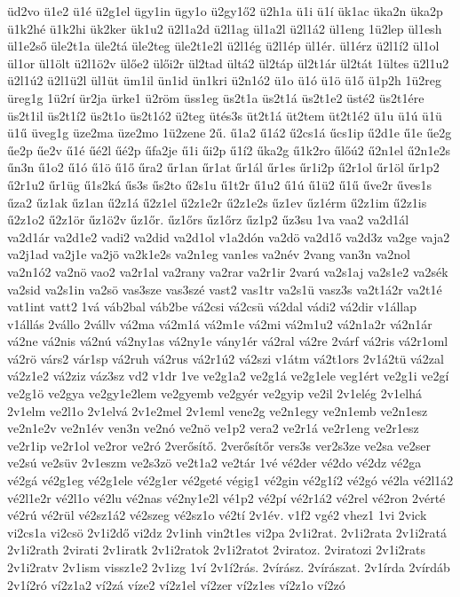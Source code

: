{üd2vo
ü1e2
ü1é
ü2g1el
ügy1in
ügy1o
ü2gy1ő2
ü2h1a
ü1i
ü1í
ük1ac
üka2n
üka2p
ü1k2hé
ü1k2hi
ük2ker
ük1u2
ü2l1a2d
ü2l1ag
ül1a2l
ü2l1á2
ül1eng
1ü2lep
ül1esh
ül1e2ső
üle2t1a
üle2tá
üle2teg
üle2t1e2l
ü2l1ég
ü2l1ép
ül1ér.
ül1érz
ü2l1í2
ül1ol
ül1or
ül1ölt
ü2l1ö2v
ülőe2
ülői2r
ül2tad
ültá2
ül2táp
ül2t1ár
ül2tát
1ültes
ü2l1u2
ü2l1ú2
ü2l1ü2l
ül1üt
üm1il
ün1id
ün1kri
ü2n1ó2
ü1o
ü1ó
ü1ö
ü1ő
ü1p2h
1ü2reg
üreg1g
1ü2rí
ür2ja
ürke1
ü2röm
üss1eg
üs2t1a
üs2t1á
üs2t1e2
üsté2
üs2t1ére
üs2t1il
üs2t1í2
üs2t1o
üs2t1ó2
ü2teg
ütés3s
üt2t1á
üt2tem
üt2t1é2
ü1u
ü1ú
ü1ü
ü1ű
üveg1g
üze2ma
üze2mo
1ü2zene
2ű.
ű1a2
ű1á2
ű2cs1á
űcs1ip
ű2d1e
ű1e
űe2g
űe2p
űe2v
ű1é
űé2l
űé2p
űfa2je
ű1i
űi2p
ű1í2
űka2g
ű1k2ro
űlőú2
ű2n1el
ű2n1e2s
űn3n
ű1o2
ű1ó
ű1ö
ű1ő
űra2
űr1an
űr1at
űr1ál
űr1es
űr1i2p
ű2r1ol
űr1öl
űr1p2
ű2r1u2
űr1üg
ű1s2ká
űs3s
űs2to
ű2s1u
ű1t2r
ű1u2
ű1ú
ű1ü2
ű1ű
űve2r
űves1s
űza2
űz1ak
űz1an
ű2z1á
ű2z1el
ű2z1e2r
ű2z1e2s
űz1ev
űz1érm
ű2z1im
ű2z1is
ű2z1o2
ű2z1ör
űz1ö2v
űz1őr.
űz1őrs
űz1őrz
űz1p2
űz3su
1va
vaa2
va2d1ál
va2d1ár
va2d1e2
vadi2
va2did
va2d1ol
v1a2dón
va2dö
va2d1ő
va2d3z
va2ge
vaja2
va2j1ad
va2j1e
va2jö
va2k1e2s
va2n1eg
van1es
va2név
2vang
van3n
va2nol
va2n1ó2
va2nö
vao2
va2r1al
va2rany
va2rar
va2r1ir
2varú
va2s1aj
va2s1e2
va2sék
va2sid
va2s1in
va2sö
vas3sze
vas3szé
vast2
vas1tr
va2s1ü
vasz3s
va2t1á2r
va2t1é
vat1int
vatt2
1vá
váb2bal
váb2be
vá2csi
vá2csü
vá2dal
vádi2
vá2dir
v1állap
v1állás
2vállo
2vállv
vá2ma
vá2m1á
vá2m1e
vá2mi
vá2m1u2
vá2n1a2r
vá2n1ár
vá2ne
vá2nis
vá2nú
vá2ny1as
vá2ny1e
vány1ér
vá2ral
vá2re
2várf
vá2ris
vá2r1oml
vá2rö
várs2
vár1sp
vá2ruh
vá2rus
vá2r1ú2
vá2szi
v1átm
vá2t1ors
2v1á2tü
vá2zal
vá2z1e2
vá2ziz
váz3sz
vd2
v1dr
1ve
ve2g1a2
ve2g1á
ve2g1ele
veg1ért
ve2g1i
ve2gí
ve2g1ö
ve2gya
ve2gy1e2lem
ve2gyemb
ve2gyér
ve2gyip
ve2il
2v1elég
2v1elhá
2v1elm
ve2l1o
2v1elvá
2v1e2mel
2v1eml
vene2g
ve2n1egy
ve2n1emb
ve2n1esz
ve2n1e2v
ve2n1év
ven3n
ve2nó
ve2nö
ve1p2
vera2
ve2r1á
ve2r1eng
ve2r1esz
ve2r1ip
ve2r1ol
ve2ror
ve2ró
2verősítő.
2verősítőr
vers3s
ver2s3ze
ve2sa
ve2ser
ve2sú
ve2süv
2v1eszm
ve2s3zö
ve2t1a2
ve2tár
1vé
vé2der
vé2do
vé2dz
vé2ga
vé2gá
vé2g1eg
vé2g1ele
vé2g1er
vé2geté
végig1
vé2gin
vé2g1í2
vé2gó
vé2la
vé2l1á2
vé2l1e2r
vé2l1o
vé2lu
vé2nas
vé2ny1e2l
vé1p2
vé2pí
vé2r1á2
vé2rel
vé2ron
2vérté
vé2rú
vé2rül
vé2sz1á2
vé2szeg
vé2sz1o
vé2tí
2v1év.
v1f2
vgé2
vhez1
1vi
2vick
vi2cs1a
vi2csö
2v1i2dő
vi2dz
2v1inh
vin2t1es
vi2pa
2v1i2rat.
2v1i2rata
2v1i2ratá
2v1i2rath
2virati
2v1iratk
2v1i2ratok
2v1i2ratot
2viratoz.
2viratozi
2v1i2rats
2v1i2ratv
2v1ism
vissz1e2
2v1izg
1ví
2v1í2rás.
2vírász.
2vírászat.
2v1írda
2vírdáb
2v1í2ró
ví2z1a2
ví2zá
víze2
ví2z1el
ví2zer
ví2z1es
ví2z1o
ví2zó
}
